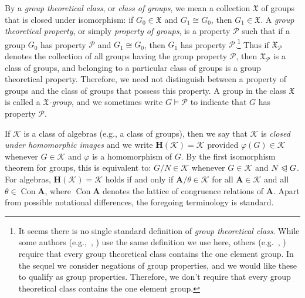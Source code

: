\documentclass{gen-j-l}
\newcommand{\<}{\ensuremath{\langle}}
\renewcommand{\>}{\ensuremath{\rangle}}
\theoremstyle{plain}
\theoremstyle{definition}
\theoremstyle{remark}
\numberwithin{theorem}{section}
\numberwithin{claim}{section}
\numberwithin{equation}{section}
\numberwithin{conjecture}{section}
\newcommand{\defn}[1]{\emph{#1}}
\newcommand{\subnormal}{\ensuremath{\trianglelefteqslant}}
\newcommand{\Con}{\ensuremath{\operatorname{Con}}}
\newcommand{\2}{\ensuremath{\mathbf{2}}}
\newcommand{\3}{\ensuremath{\mathbf{3}}}
\newcommand{\bA}{\ensuremath{\mathbf{A}}}
\newcommand{\sG}{\ensuremath{\mathfrak{X}}}
\newcommand{\bH}{\ensuremath{\mathbf{H}}}
\newcommand{\sK}{\ensuremath{\mathscr{K}}}
\newcommand{\cP}{\ensuremath{\mathcal{P}}}
\renewcommand{\phi}{\ensuremath{\varphi}}
\begin{document}
By a \defn{group theoretical class}, or \defn{class of groups}, we mean a
collection $\sG$ of groups that is closed under isomorphism:
if $G_0\in \sG$ and  $G_1\cong G_0$, then $G_1\in \sG$.
A \defn{group theoretical property}, or simply \defn{property of groups},
is a property $\cP$ such that if a group $G_0$ has property $\cP$ and
$G_1\cong G_0$, then $G_1$ has property $\cP$.\footnote{It seems there
  is no single standard definition of \emph{group theoretical class}.
  While some authors (e.g.,~\cite{Doerk:1992}, \cite{BBE:2006}) use the same
  definition we use here, others (e.g.~\cite{Robinson:1996}, \cite{Rose:1978})
  require that every group theoretical class contains the one element group. 
  In the sequel we consider negations of group properties, and we would
  like these to qualify as group properties.  Therefore, we don't require
  that every group theoretical class contains the one element group.}   
Thus if $\sG_{\cP}$ denotes the collection of all groups having the group
property $\cP$, then  $\sG_{\cP}$  is a class of groups, and belonging to a
particular class of groups is a group theoretical property.  Therefore, we need not
distinguish between a property of groups and the class of groups that possess
this property.
A group in the class $\sG$ is called a 
\emph{$\sG$-group}, and 
we sometimes write $G \vDash \cP$ to indicate
that $G$ has property $\cP$. %

If $\sK$ is a class of algebras (e.g., a class of groups), then we say that
$\sK$ is \emph{closed under homomorphic images} and we write $\bH(\sK) = \sK$
provided $\phi(G)\in \sK$ whenever $G\in \sK$ and $\phi$ is a homomorphism of
$G$. By the first isomorphism theorem for
  groups, this is equivalent to: 
$G/N\in \sK$ whenever $G\in \sK$ and $N\subnormal G$.  For algebras, 
$\bH(\sK) = \sK$ holds if and only if $\bA/\theta \in \sK$ for all $\bA\in \sK$
  and all $\theta \in \Con\bA$, where $\Con\bA$ denotes the lattice of
  congruence relations of $\bA$. 
Apart from possible notational differences, the foregoing terminology is
standard.  
\end{document}
